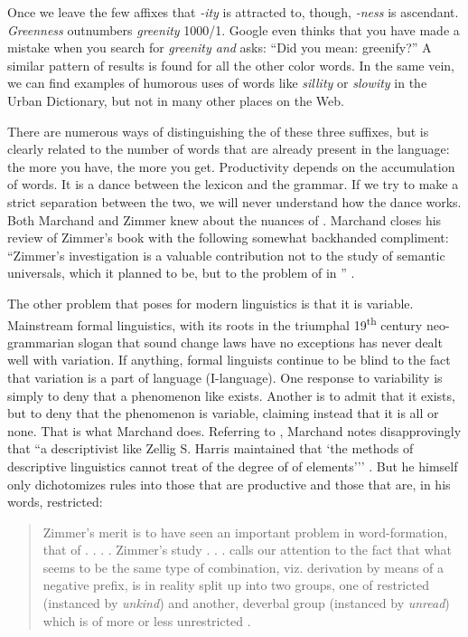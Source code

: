 \documentclass[output=paper]{langsci/langscibook}
\begin{document}
Once we leave the few affixes that \emph{-ity} is attracted to, though,
\emph{-ness} is ascendant. \emph{Greenness} outnumbers \emph{greenity}
1000/1. Google even thinks that you have made a mistake when you search
for \emph{greenity and} asks: ``Did you mean: greenify?'' A similar
pattern of results is found for all the other color words. In the same
vein, we can find examples of humorous uses of words like \emph{sillity}
or \emph{slowity} in the Urban Dictionary, but not in many other places
on the Web.

There are numerous ways of distinguishing the  of these
three suffixes, but  is clearly related to the number of
words that are already present in the language: the more you have, the
more you get. Productivity depends on the accumulation of words. It is a
dance between the lexicon and the grammar. If we try to make a strict
separation between the two, we will never understand how the dance
works. Both Marchand and Zimmer knew about the nuances of .
Marchand closes his review of Zimmer's book with the following somewhat
backhanded compliment: ``Zimmer's investigation is a valuable
contribution not to the study of semantic universals, which it planned
to be, but to the problem of  in '' \citep[142]{Marchand66}.

The other problem that  poses for modern linguistics is that
it is variable. Mainstream formal linguistics, with its roots in the
triumphal 19\textsuperscript{th} century neo-grammarian slogan that
sound change laws have no exceptions %
\citep{Paul1880} %
%
has never dealt well
with variation. If anything, formal linguists continue to be blind to
the fact that variation is a part of language (I-language). One response
to variability is simply to deny that a phenomenon like 
exists. Another is to admit that it exists, but to deny that the
phenomenon is variable, claiming instead that it is all or none. That is
what Marchand does. Referring to \citet[225]{Harris1951}, Marchand notes disapprovingly that ``a descriptivist
like Zellig S. Harris maintained that `the methods of descriptive
linguistics cannot treat of the degree of  of elements{'}''
\citep[141]{Marchand66}
%
%
%
. But he himself only dichotomizes 
rules into those that are productive and those that are, in his words,
restricted:

\begin{quote}
Zimmer's merit is to have seen an important problem in word-formation,
that of . . . . Zimmer's study . . . calls our attention to
the fact that what seems to be the same type of combination, viz.
derivation by means of a negative prefix, is in reality split up into
two groups, one of restricted  (instanced by \emph{unkind})
and another, deverbal group (instanced by \emph{unread}) which is of
more or less unrestricted  \citep[141]{Marchand66}.
\end{quote}
\end{document}

